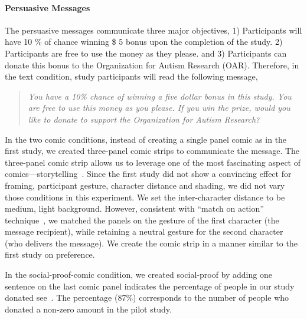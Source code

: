 \paragraph{Persuasive Messages}

The persuasive messages communicate three major objectives, 1) Participants will have 10 \% of chance winning \$ 5 bonus upon the completion of the study. 2) Participants are free to use the money as they please. and 3) Participants can donate this bonus to the Organization for Autism Research (OAR). Therefore, in the text condition, study participants will read the following message,
\begin{quote}
  \textit{You have a 10\% chance of winning a five dollar bonus in this study. You are free to use this money as you please. If you win the prize, would you like to donate to support the Organization for Autism Research?}
\end{quote}
In the two comic conditions, instead of creating a single panel comic as in the first study, we created three-panel comic strips to communicate the message. The three-panel comic strip allows us to leverage one of the most fascinating aspect of comics---storytelling~\cite{scott1993understanding}. Since the first study did not show a convincing effect for framing, participant gesture, character distance and shading, we did not vary those conditions in this experiment. We set the inter-character distance to be medium, light background. However, consistent with ``match on action'' technique~\cite{scott1993understanding}, we matched the panels on the gesture of the first character (the message recipient), while retaining a neutral gesture for the second character (who delivers the message). We create the comic strip in a manner similar to the first study on preference.


In the social-proof-comic condition, we created social-proof by adding one sentence on the last comic panel indicates the percentage of people in our study donated see~. The percentage (87\%) corresponds to the number of people who donated a non-zero amount in the pilot study.

